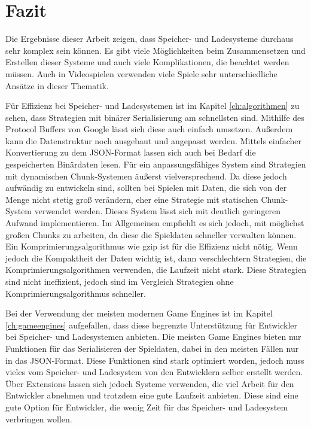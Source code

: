 \chapter{Fazit}\label{ch:fazit}
Die Ergebnisse dieser Arbeit zeigen, dass Speicher- und Ladesysteme durchaus sehr komplex sein können. Es gibt viele Möglichkeiten beim Zusammensetzen und Erstellen dieser Systeme und auch viele Komplikationen, die beachtet werden müssen. Auch in Videospielen verwenden viele Spiele sehr unterschiedliche Ansätze in dieser Thematik. 

Für Effizienz bei Speicher- und Ladesystemen ist im Kapitel \ref{ch:algorithmen} zu sehen, dass Strategien mit binärer Serialisierung am schnellsten sind. Mithilfe des Protocol Buffers von Google lässt sich diese auch einfach umsetzen. Außerdem kann die Datenstruktur noch ausgebaut und angepasst werden. Mittels einfacher Konvertierung zu dem JSON-Format lassen sich auch bei Bedarf die gespeicherten Binärdaten lesen. Für ein anpassungsfähiges System sind Strategien mit dynamischen Chunk-Systemen äußerst vielversprechend. Da diese jedoch aufwändig zu entwickeln sind, sollten bei Spielen mit Daten, die sich von der Menge nicht stetig groß verändern, eher eine Strategie mit statischen Chunk-System verwendet werden. Dieses System lässt sich mit deutlich geringeren Aufwand implementieren. Im Allgemeinen empfiehlt es sich jedoch, mit möglichst großen Chunks zu arbeiten, da diese die Spieldaten schneller verwalten können. Ein Komprimierungsalgorithmus wie \ac{gzip} ist für die Effizienz nicht nötig. Wenn jedoch die Kompaktheit der Daten wichtig ist, dann verschlechtern Strategien, die Komprimierungsalgorithmen verwenden, die Laufzeit nicht stark. Diese Strategien sind nicht ineffizient, jedoch sind im Vergleich Strategien ohne Komprimierungsalgorithmus schneller.

Bei der Verwendung der meisten modernen Game Engines ist im Kapitel \ref{ch:gameengines} aufgefallen, dass diese begrenzte Unterstützung für Entwickler bei Speicher- und Ladesystemen anbieten. Die meisten Game Engines bieten nur Funktionen für das Serialisieren der Spieldaten, dabei in den meisten Fällen nur in das JSON-Format. Diese Funktionen sind stark optimiert worden, jedoch muss vieles vom Speicher- und Ladesystem von den Entwicklern selber erstellt werden. Über Extensions lassen sich jedoch Systeme verwenden, die viel Arbeit für den Entwickler abnehmen und trotzdem eine gute Laufzeit anbieten. Diese sind eine gute Option für Entwickler, die wenig Zeit für das Speicher- und Ladesystem verbringen wollen.

